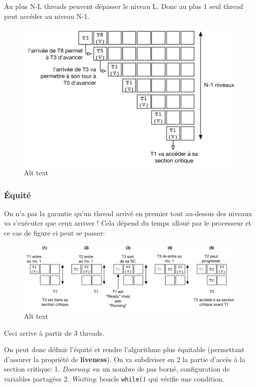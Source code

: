 Au plus N-L threads peuvent dépasser le niveau L. Donc au plus 1 seul
thread peut accéder au niveau N-1.

\begin{figure}
\centering
\includegraphics{image-26.png}
\caption{Alt text}
\end{figure}

\subsubsection{Équité}\label{uxe9quituxe9}

On n'a pas la garantie qu'un thread arrivé en premier tout au-dessus des
niveaux va s'exécuter que ceux arriver ! Cela dépend du temps alloué par
le processeur et ce cas de figure ci peut se passer:

\begin{figure}
\centering
\includegraphics{image-27.png}
\caption{Alt text}
\end{figure}

Ceci arrive à partir de 3 threads.

On peut donc définir l'équité et rendre l'algorithme plus équitable
(permettant d'assurer la propriété de \textbf{liveness}). On va
subdiviser en 2 la partie d'accès à la section critique: 1.
\emph{Doorway}: en un nombre de pas borné, configuration de variables
partagées 2. \emph{Waiting}: boucle \texttt{while()} qui vérifie une
condition.

